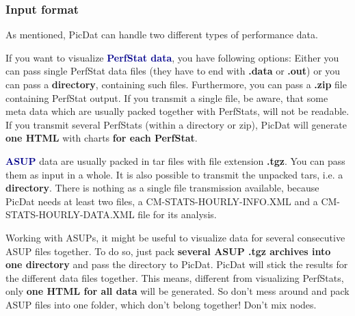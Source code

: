 \documentclass[8pt]{beamer}
\begin{document}
\begin{frame}
\frametitle{Input format}
As mentioned, PicDat can handle two different types of performance data.
\bigskip

If you want to visualize \textcolor{darkblue}{\textbf{PerfStat data}}, you have following options: Either you can pass single PerfStat data files (they have to end with \textbf{.data} or \textbf{.out}) or you can pass a \textbf{directory}, containing such files. Furthermore, you can pass a \textbf{.zip} file containing PerfStat output. If you transmit a single file, be aware, that some meta data which are usually packed together with PerfStats, will not be readable. If you transmit several PerfStats (within a directory or zip), PicDat will generate \textbf{one HTML} with charts \textbf{for each PerfStat}. 
\bigskip

\textcolor{darkblue}{\textbf{ASUP}} data are usually packed in tar files with file extension \textbf{.tgz}. You can pass them as input in a whole. It is also possible to transmit the unpacked tars, i.e. a \textbf{directory}. There is nothing as a single file transmission available, because PicDat needs at least two files, a CM-STATS-HOURLY-INFO.XML and a CM-STATS-HOURLY-DATA.XML file for its analysis. 

Working with ASUPs, it might be useful to visualize data for several consecutive ASUP files together. To do so, just pack \textbf{several ASUP .tgz archives into one directory} and pass the directory to PicDat. PicDat will stick the results for the different data files together. This means, different from visualizing PerfStats, only \textbf{one HTML for all data} will be generated. So don't mess around and pack ASUP files into one folder, which don't belong together! Don't mix nodes.
\end{frame}
\end{document}
